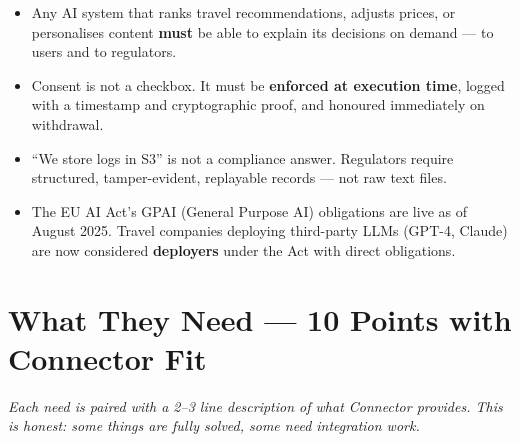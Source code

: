 \documentclass[11pt, a4paper]{article}
\begin{document}
\begin{itemize}
  \item Any AI system that ranks travel recommendations, adjusts prices, or personalises content
        \textbf{must} be able to explain its decisions on demand --- to users and to regulators.
  \item Consent is not a checkbox. It must be \textbf{enforced at execution time}, logged with a
        timestamp and cryptographic proof, and honoured immediately on withdrawal.
  \item ``We store logs in S3'' is not a compliance answer. Regulators require structured,
        tamper-evident, replayable records --- not raw text files.
  \item The EU AI Act's GPAI (General Purpose AI) obligations are live as of August 2025.
        Travel companies deploying third-party LLMs (GPT-4, Claude) are now considered
        \textbf{deployers} under the Act with direct obligations.
\end{itemize}

\newpage
\section{What They Need --- 10 Points with Connector Fit}

\begin{notebox}
\textit{Each need is paired with a 2--3 line description of what Connector provides. This is honest: some things are fully solved, some need integration work.}
\end{notebox}

\vspace{0.5em}
\end{document}

